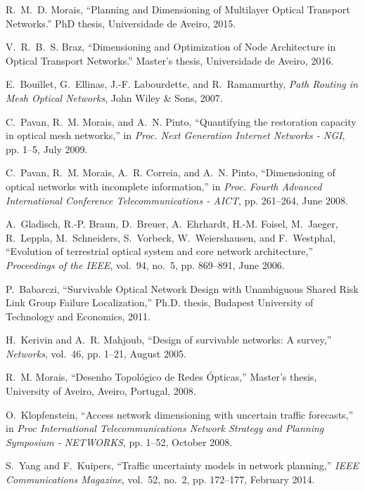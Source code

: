 \begin{thebibliography}{10}
R.~M.~D. Morais, ``Planning and Dimensioning of Multilayer Optical Transport Networks.'' PhD thesis, Universidade de Aveiro, 2015.

V.~R.~B.~S. Braz, ``Dimensioning and Optimization of Node Architecture in Optical Transport Networks.'' Master's thesis, Universidade de Aveiro, 2016.

E.~Bouillet, G.~Ellinas, J.-F. Labourdette, and R.~Ramamurthy, \emph{Path Routing in Mesh Optical Networks}, John Wiley \& Sons, 2007.

C.~Pavan, R.~M. Morais, and A.~N. Pinto, ``Quantifying the restoration capacity in optical mesh networks,'' in \emph{Proc. Next Generation Internet Networks - NGI}, pp. 1--5, July 2009.

C.~Pavan, R.~M. Morais, A.~R. Correia, and A.~N. Pinto, ``Dimensioning of optical networks with incomplete information,'' in \emph{Proc. Fourth Advanced International Conference Telecommunications - AICT}, pp. 261--264, June 2008.

A.~Gladisch, R.-P. Braun, D.~Breuer, A.~Ehrhardt, H.-M. Foisel, M.~Jaeger,
  R.~Leppla, M.~Schneiders, S.~Vorbeck, W.~Weiershausen, and F.~Westphal,
  ``Evolution of terrestrial optical system and core network architecture,''
  \emph{Proceedings of the IEEE}, vol.~94, no.~5, pp. 869--891, June 2006.

P.~Babarczi, ``Survivable Optical Network Design with Unambiguous Shared Risk
  Link Group Failure Localization,'' Ph.D. thesis, Budapest University of
  Technology and Economics, 2011.

H.~Kerivin and A.~R. Mahjoub, ``Design of survivable networks: A survey,'' \emph{Networks}, vol.~46, pp. 1--21, August 2005.

R.~M. Morais, ``Desenho Topol{\'o}gico de Redes {\'O}pticas,'' Master's thesis, University of Aveiro, Aveiro, Portugal, 2008.

O.~Klopfenstein, ``Access network dimensioning with uncertain traffic forecasts,'' in \emph{Proc International Telecommunications Network Strategy and Planning Symposium - NETWORKS}, pp. 1--52, October 2008.

S.~Yang and F.~Kuipers, ``Traffic uncertainty models in network planning,'' \emph{IEEE Communications Magazine}, vol.~52, no.~2, pp. 172--177, February 2014.


\end{thebibliography}
